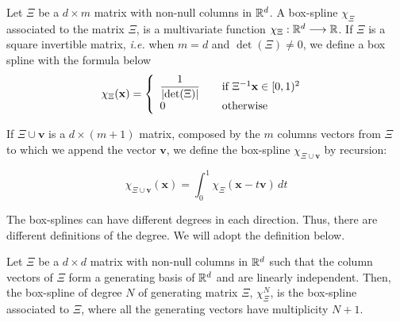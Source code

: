 \documentclass[proc]{edpsmath}
\begin{document}
\begin{dfntn}

	Let $\Xi$ be a $d \times m$ matrix with non-null columns in  $\mathbb{R}^d$. A box-spline $\chi_\Xi$ associated to the matrix $\Xi$, is a multivariate function $\chi_\Xi : \mathbb{R}^d \longrightarrow \mathbb{R}$. If $\Xi$ is a square invertible matrix, \emph{i.e.} when $m = d$ and $\det(\Xi) \neq 0$, we define a box spline with the formula below
	\begin{equation}
		\chi_{\Xi} (\mathbf{x}) = \left\{
  		\begin{array}{l l}
    		\dfrac{1}{\lvert \det(\Xi)\rvert} & \quad \text{if $\Xi^{-1}\mathbf{x} \in [0,1)^2$ }\\
    		0 & \quad \text{otherwise}
  		\end{array} \right.
	\end{equation}

	If $\Xi \cup \mathbf{v}$ is a $d \times (m + 1)$ matrix, composed by the $m$ columns vectors from $\Xi$ to which we append the vector $\mathbf{v}$, we define the box-spline $\chi_{\Xi \cup \mathbf{v}}$ by recursion:

	\begin{equation} 
	\label{eqn:boxsplines_basis}
		\chi_{\Xi \cup \mathbf{v}}(\mathbf{x}) = \int_0^ 1 \chi_\Xi(\mathbf{x}-t\mathbf{v}) \, dt
	\end{equation}

\end{dfntn}

\rmrk The box-splines can have different degrees in each direction. Thus, there are different definitions of the degree. We will adopt the definition below.

\begin{dfntn}
Let $\Xi$ be a $d \times d$ matrix with non-null columns in $\mathbb{R}^d$ such that the column vectors of $\Xi$ form a generating basis of $\mathbb{R}^d$ and are linearly independent. Then, the box-spline of degree $N$ of generating matrix $\Xi$, $\chi^N_\Xi$, is the box-spline associated to $\Xi$, where all the generating vectors have multiplicity $N+1$. %


\end{dfntn}
\end{document}
